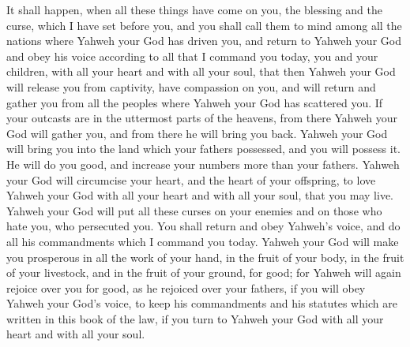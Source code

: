  It shall happen, when all these things have come on you,
the blessing and the curse, which I have set before you, and you shall
call them to mind among all the nations where Yahweh your God has driven
you,  and return to Yahweh your God and obey his voice
according to all that I command you today, you and your children, with
all your heart and with all your soul,  that then Yahweh
your God will release you from captivity, have compassion on you, and
will return and gather you from all the peoples where Yahweh your God
has scattered you.  If your outcasts are in the uttermost
parts of the heavens, from there Yahweh your God will gather you, and
from there he will bring you back.  Yahweh your God will
bring you into the land which your fathers possessed, and you will
possess it. He will do you good, and increase your numbers more than
your fathers.  Yahweh your God will circumcise your heart,
and the heart of your offspring, to love Yahweh your God with all your
heart and with all your soul, that you may live.  Yahweh
your God will put all these curses on your enemies and on those who hate
you, who persecuted you.  You shall return and obey Yahweh's
voice, and do all his commandments which I command you today.
 Yahweh your God will make you prosperous in all the work of
your hand, in the fruit of your body, in the fruit of your livestock,
and in the fruit of your ground, for good; for Yahweh will again rejoice
over you for good, as he rejoiced over your fathers,  if
you will obey Yahweh your God's voice, to keep his commandments and his
statutes which are written in this book of the law, if you turn to
Yahweh your God with all your heart and with all your soul.

